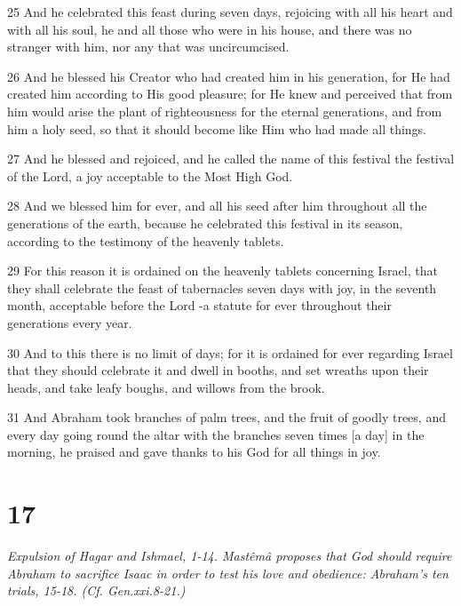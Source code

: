 \par 25 And he celebrated this feast during seven days, rejoicing with all his heart and with all his soul, he and all those who were in his house, and there was no stranger with him, nor any that was uncircumcised.
\par 26 And he blessed his Creator who had created him in his generation, for He had created him according to His good pleasure; for He knew and perceived that from him would arise the plant of righteousness for the eternal generations, and from him a holy seed, so that it should become like Him who had made all things.
\par 27 And he blessed and rejoiced, and he called the name of this festival the festival of the Lord, a joy acceptable to the Most High God.
\par 28 And we blessed him for ever, and all his seed after him throughout all the generations of the earth, because he celebrated this festival in its season, according to the testimony of the heavenly tablets.
\par 29 For this reason it is ordained on the heavenly tablets concerning Israel, that they shall celebrate the feast of tabernacles seven days with joy, in the seventh month, acceptable before the Lord -a statute for ever throughout their generations every year.
\par 30 And to this there is no limit of days; for it is ordained for ever regarding Israel that they should celebrate it and dwell in booths, and set wreaths upon their heads, and take leafy boughs, and willows from the brook.
\par 31 And Abraham took branches of palm trees, and the fruit of goodly trees, and every day going round the altar with the branches seven times [a day] in the morning, he praised and gave thanks to his God for all things in joy.

\chapter{17}

\par \textit{Expulsion of Hagar and Ishmael, 1-14. Mastêmâ proposes that God should require Abraham to sacrifice Isaac in order to test his love and obedience: Abraham's ten trials, 15-18. (Cf. Gen.xxi.8-21.)}

